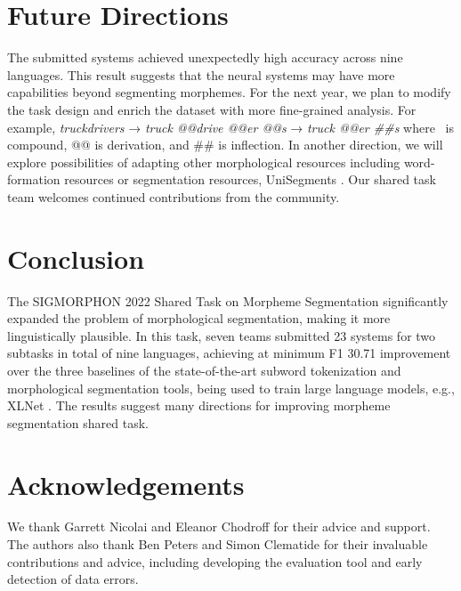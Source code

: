 \documentclass[11pt]{article}
\begin{document}
\section{Future Directions}
The submitted systems achieved unexpectedly high accuracy across nine languages. This result suggests that the neural systems may have more capabilities beyond segmenting morphemes. For the next year, we plan to modify the task design and enrich the dataset with more fine-grained analysis. For example, \textit{truckdrivers} → \textit{truck @@drive @@er @@s} → \textit{truck \drive @@er \#\#s} where \ is compound, @@ is derivation, and \#\# is inflection.
In another direction, we will explore possibilities of adapting other morphological resources including word-formation resources \cite{zeller2013derivbase,talamo2016derivatario,derinet-2019,vodolazsky2020derivbase} or segmentation resources, UniSegments \cite{unisegments-lrec-2022,unisegments-data-2022}. Our shared task team welcomes continued contributions from the community. 






\section{Conclusion}
The SIGMORPHON 2022 Shared Task on Morpheme Segmentation significantly expanded the problem of morphological segmentation, making it more linguistically plausible. In this task, seven teams submitted 23 systems for two subtasks in total of nine languages, achieving at minimum F1 30.71 improvement over the three baselines of the state-of-the-art subword tokenization and morphological segmentation tools, being used to train large language models, e.g., XLNet \cite{yang2019xlnet}. The results suggest many directions for improving morpheme segmentation shared task.

\nocite{Ando2005,borschinger-johnson-2011-particle,andrew2007scalable,rasooli-tetrault-2015,goodman-etal-2016-noise,harper-2014-learning}

\section*{Acknowledgements}
We thank Garrett Nicolai and Eleanor Chodroff for their advice and support. The authors also thank Ben Peters and Simon Clematide for their invaluable contributions and advice, including developing the evaluation tool and early detection of data errors. 



\end{document}
